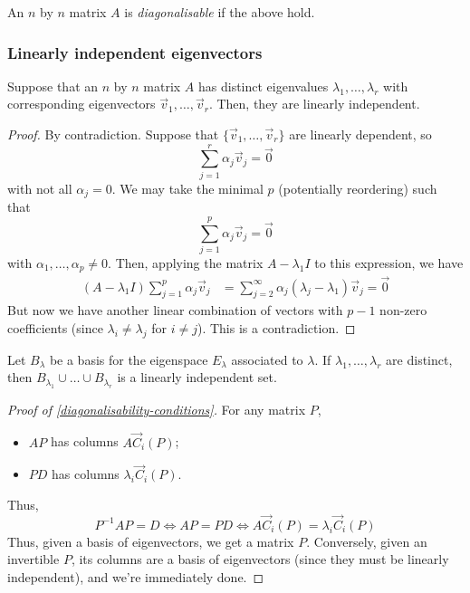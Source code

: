 \documentclass{../template/note}
\begin{document}
    \begin{definition}
        An \(n\) by \(n\) matrix \(A\) is \emph{diagonalisable} if the above hold.
    \end{definition}
    

    \subsubsection{Linearly independent eigenvectors}

    \begin{theorem}
        Suppose that an \(n\) by \(n\) matrix \(A\) has distinct eigenvalues \(\lambda_1, \dots, \lambda_r\) with corresponding eigenvectors \(\vec v_1, \dots, \vec v_r\). Then, they are linearly independent.
    \end{theorem}
    
    \begin{proof}
        By contradiction. Suppose that \(\{\vec v_1, \dots, \vec v_r\}\) are linearly dependent, so
        \[
            \sum_{j=1}^r \alpha_j \vec v_j = \vec 0
        \]
        with not all \(\alpha_j = 0\). We may take the minimal \(p\) (potentially reordering) such that
        \[
            \sum_{j=1}^p \alpha_j \vec v_j = \vec 0
        \]
        with \(\alpha_1, \dots, \alpha_p \neq 0\). Then, applying the matrix \(A - \lambda_1I\) to this expression, we have
        \begin{align*}
            (A - \lambda_1I)\sum_{j=1}^p \alpha_j \vec v_j &= \sum_{j=2}^\infty \alpha_j (\lambda_j - \lambda_1)\vec v_j = \vec 0
        \end{align*}
        But now we have another linear combination of vectors with \(p-1\) non-zero coefficients (since \(\lambda_i \neq \lambda_j\) for \(i \neq j\)). This is a contradiction.
    \end{proof}
    
    \begin{remark}
        Let \(B_\lambda\) be a basis for the eigenspace \(E_\lambda\) associated to \(\lambda\). If \(\lambda_1, \dots, \lambda_r\) are distinct, then \(B_{\lambda_1} \cup \dots \cup B_{\lambda_r}\) is a linearly independent set.
    \end{remark}

    \begin{proof}[Proof of \cref{diagonalisability-conditions}]
        For any matrix \(P\),
        \begin{itemize}
            \item \(AP\) has columns \(A\vec C_i(P)\);
            \item \(PD\) has columns \(\lambda_i \vec C_i(P)\).
        \end{itemize}
        Thus,
        \[
            P^{-1}AP = D \iff AP = PD \iff A \vec C_i(P) = \lambda_i \vec C_i(P)
        \]
        Thus, given a basis of eigenvectors, we get a matrix \(P\). Conversely, given an invertible \(P\), its columns are a basis of eigenvectors (since they must be linearly independent), and we're immediately done.
    \end{proof}
    
\end{document}
